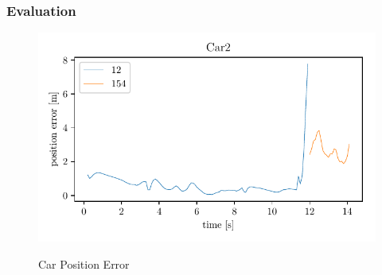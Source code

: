 \documentclass[nosymbols]{beamer}	%
\begin{document}
\begin{frame}
\frametitle{Evaluation}
\begin{figure}[!ht]
\begin{center}
\caption{Car Position Error}
\includegraphics[width=\textwidth,height=0.7\textheight,keepaspectratio]{bilder/Car2_pos_err.pdf}
\label{obst_cases}
\end{center}
\end{figure}
\end{frame}
\end{document}
